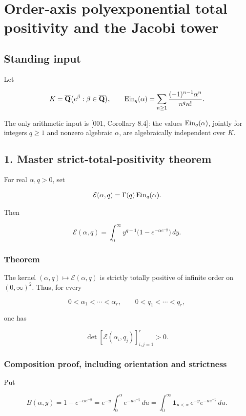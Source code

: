 \section{Order-axis polyexponential total positivity and the Jacobi tower}

\subsection{Standing input}

Let

\[
K=\overline{\mathbf Q}\bigl(e^\beta:\beta\in\overline{\mathbf Q}\bigr),\qquad
\operatorname{Ein}_q(\alpha)=\sum_{n\ge1}\frac{(-1)^{n-1}\alpha^n}{n^q n!}.
\]

The only arithmetic input is {[}001, Corollary 8.4{]}: the values
\(\operatorname{Ein}_q(\alpha)\), jointly for integers \(q\ge1\) and nonzero algebraic
\(\alpha\), are algebraically independent over \(K\).

\subsection{1. Master strict-total-positivity theorem}

For real \(\alpha,q>0\), set

\[
\mathcal E(\alpha,q)=\Gamma(q)\operatorname{Ein}_q(\alpha).
\]

Then

\[
\mathcal E(\alpha,q)
=\int_0^\infty y^{q-1}\bigl(1-e^{-\alpha e^{-y}}\bigr)\,dy. \tag{TP-1}
\]

\subsubsection{Theorem}

The kernel \((\alpha,q)\mapsto\mathcal E(\alpha,q)\) is strictly totally
positive of infinite order on \((0,\infty)^2\). Thus, for every

\[
0<\alpha_1<\cdots<\alpha_r,\qquad 0<q_1<\cdots<q_r,
\]

one has

\[
\det[\mathcal E(\alpha_i,q_j)]_{i,j=1}^r>0. \tag{TP-2}
\]

\subsubsection{Composition proof, including orientation and strictness}

Put

\[
B(\alpha,y)=1-e^{-\alpha e^{-y}}
=e^{-y}\int_0^\alpha e^{-u e^{-y}}\,du
=\int_0^\infty \mathbf1_{u<\alpha}\,e^{-y}e^{-u e^{-y}}\,du. \tag{TP-3}
\]

